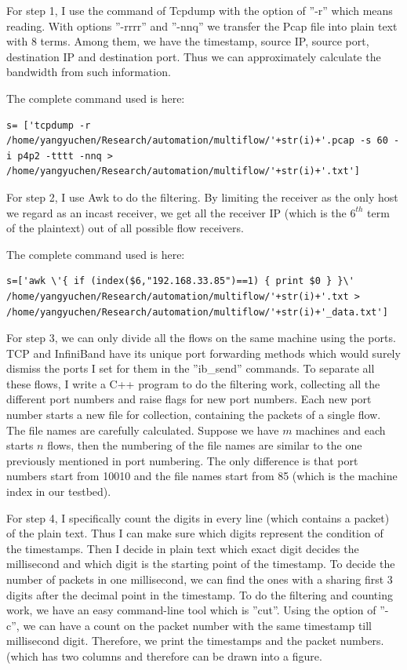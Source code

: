 \documentclass[12pt,a4paper]{article}
\begin{document}
For step 1, I use the command of Tcpdump with the option of ''-r'' which means reading.
With options ''-rrrr'' and ''-nnq'' we transfer the Pcap file into plain text with 8 terms.
Among them, we have the timestamp, source IP, source port, destination IP and destination port.
Thus we can approximately calculate the bandwidth from such information.

The complete command used is here:
\begin{lstlisting}
s= ['tcpdump -r /home/yangyuchen/Research/automation/multiflow/'+str(i)+'.pcap -s 60 -i p4p2 -tttt -nnq > /home/yangyuchen/Research/automation/multiflow/'+str(i)+'.txt']
\end{lstlisting}

For step 2, I use Awk to do the filtering. By limiting the receiver as the only host we regard as an incast receiver, we get all the receiver IP (which is the
$6^{th}$ term of the plaintext) out of all possible flow receivers.

The complete command used is here:
\begin{lstlisting}
s=['awk \'{ if (index($6,"192.168.33.85")==1) { print $0 } }\' /home/yangyuchen/Research/automation/multiflow/'+str(i)+'.txt > /home/yangyuchen/Research/automation/multiflow/'+str(i)+'_data.txt']
\end{lstlisting}

For step 3, we can only divide all the flows on the same machine using the ports.
TCP and InfiniBand have its unique port forwarding methods which would surely dismiss the ports I set for them in the ''ib\_send'' commands.
To separate all these flows, I write a C++ program to do the filtering work, collecting all the different port numbers and raise flags for new port numbers.
Each new port number starts a new file for collection, containing the packets of a single flow.
The file names are carefully calculated.
Suppose we have $m$ machines and each starts $n$ flows, then the numbering of the file names are similar to the one previously mentioned in port numbering.
The only difference is that port numbers start from 10010 and the file names start from 85 (which is the machine index in our testbed).

For step 4, I specifically count the digits in every line (which contains a packet) of the plain text. Thus I can make sure which digits represent the condition
of the timestamps. 
Then I decide in plain text which exact digit decides the millisecond and which digit is the starting point of the timestamp.
To decide the number of packets in one millisecond, we can find the ones with a sharing first 3 digits after the decimal point in the timestamp.
To do the filtering and counting work, we have an easy command-line tool which is ''cut''.
Using the option of ''-c'', we can have a count on the packet number with the same timestamp till millisecond digit.
Therefore, we print the timestamps and the packet numbers. (which has two columns and therefore can be drawn into a figure.
\end{document}
